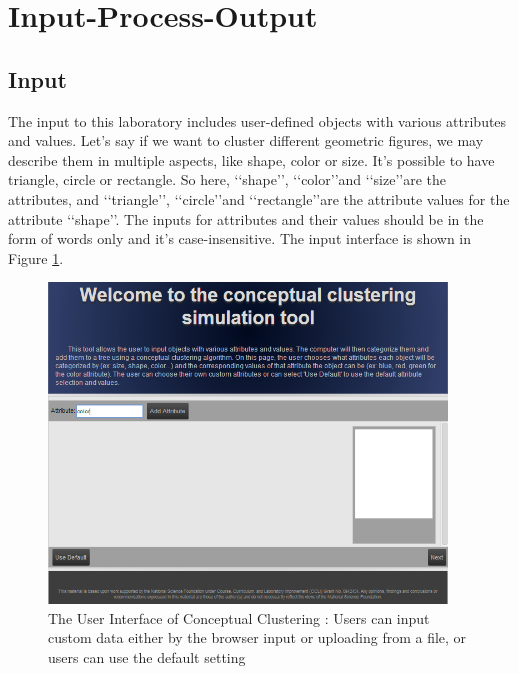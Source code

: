 %
%
%

\section{Input-Process-Output}

\subsection{Input}
The input to this laboratory includes user-defined objects with various attributes and values. Let's say if we want to cluster different geometric figures, we may describe them  in multiple aspects, like shape, color or size. It's possible to have triangle, circle or rectangle. So here, \lq\lq{shape}\rq\rq, \lq\lq{color}\rq\rq and \lq\lq{size}\rq\rq are the attributes, and \lq\lq{triangle}\rq\rq, \lq\lq{circle}\rq\rq and \lq\lq{rectangle}\rq\rq are the attribute values for the attribute \lq\lq{shape}\rq\rq. The inputs for attributes and their values should be in the form of words only and it's case-insensitive. The input interface is shown in Figure \ref{Fig:intf1}. 
  \begin{figure}[h!]
     \centering
     \includegraphics[width=300pt]{../images/interface1.jpg}
     \caption{The User Interface of Conceptual Clustering : Users can  input custom data either by the browser input or uploading from a file, or users can use the default setting}
     \label{Fig:intf1}   
     \end{figure}

